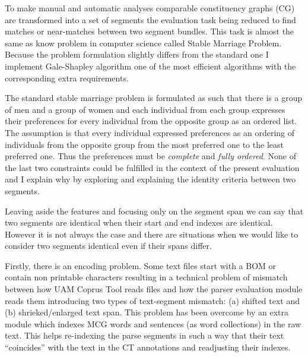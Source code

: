 To make manual and automatic analyses comparable constituency graphs (CG) are transformed into a set of segments the evaluation task being reduced to find matches or near-matches between two segment bundles. This task is almost the same as know problem in computer science called Stable Marriage Problem. Because the problem formulation slightly differs from the standard one I implement Gale-Shapley algorithm \citep{Gale1962} one of the most efficient algorithms with the corresponding extra requirements. 

The standard stable marriage problem is formulated as such that there is a group of men and a group of women and each individual from each group expresses their preferences for every individual from the opposite group as an ordered list. The assumption is that every individual expressed preferences as an ordering of individuals from the opposite group from the most preferred one to the least preferred one. Thus the preferences must be \textit{complete} and \textit{fully ordered}. None of the last two constraints could be fulfilled in the context of the present evaluation and I explain why by exploring and explaining the identity criteria between two segments. 

Leaving aside the features and focusing only on the segment span we can say that two segments are identical when their start and end indexes are identical. However it is not always the case and there are situations when we would like to consider two segments identical even if their spans differ. 

Firstly, there is an encoding problem. Some text files start with a BOM or contain non printable characters resulting in a technical problem of mismatch between how UAM Coprus Tool reads files and how the parser evaluation module reads them introducing two types of text-segment mismatch: (a) shifted text and (b) shrieked/enlarged text span. This problem has been overcome by an extra module which indexes MCG words and sentences (as word collections) in the raw text. This helps re-indexing the parse segments in such a way that their text ``coincides'' with the text in the CT annotations and readjusting their indexes. 


